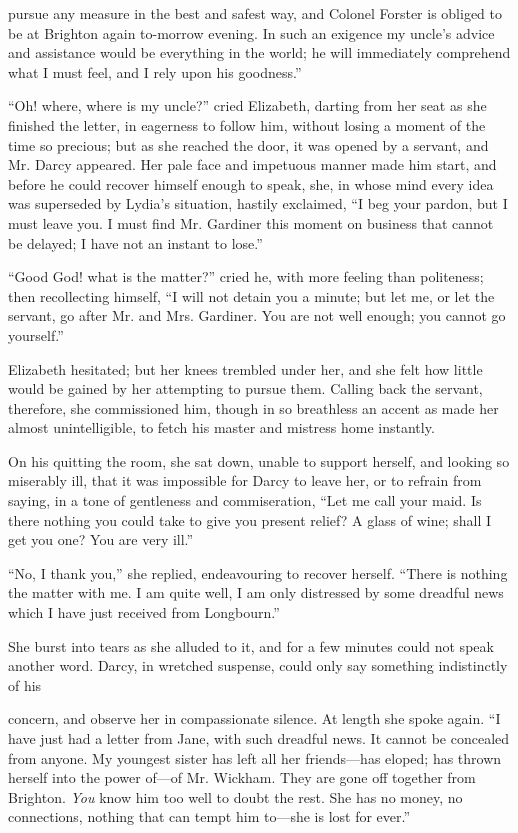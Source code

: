 pursue any measure in the best and safest way, and Colonel Forster is obliged to be at Brighton again to-morrow evening. In such an exigence my uncle's advice and assistance would be everything in the world; he will immediately comprehend what I must feel, and I rely upon his goodness.''

``Oh! where, where is my uncle?'' cried Elizabeth, darting from her seat as she finished the letter, in eagerness to follow him, without losing a moment of the time so precious; but as she reached the door, it was opened by a servant, and Mr. Darcy appeared. Her pale face and impetuous manner made him start, and before he could recover himself enough to speak, she, in whose mind every idea was superseded by Lydia's situation, hastily exclaimed, ``I beg your pardon, but I must leave you. I must find Mr. Gardiner this moment on business that cannot be delayed; I have not an instant to lose.''

``Good God! what is the matter?'' cried he, with more feeling than politeness; then recollecting himself, ``I will not detain you a minute; but let me, or let the servant, go after Mr. and Mrs. Gardiner. You are not well enough; you cannot go yourself.''

Elizabeth hesitated; but her knees trembled under her, and she felt how little would be gained by her attempting to pursue them. Calling back the servant, therefore, she commissioned him, though in so breathless an accent as made her almost unintelligible, to fetch his master and mistress home instantly.

On his quitting the room, she sat down, unable to support herself, and looking so miserably ill, that it was impossible for Darcy to leave her, or to refrain from saying, in a tone of gentleness and commiseration, ``Let me call your maid. Is there nothing you could take to give you present relief? A glass of wine; shall I get you one? You are very ill.''

``No, I thank you,'' she replied, endeavouring to recover herself. ``There is nothing the matter with me. I am quite well, I am only distressed by some dreadful news which I have just received from Longbourn.''

She burst into tears as she alluded to it, and for a few minutes could not speak another word. Darcy, in wretched suspense, could only say something indistinctly of his




concern, and observe her in compassionate silence. At length she spoke again. ``I have just had a letter from Jane, with such dreadful news. It cannot be concealed from anyone. My youngest sister has left all her friends---has eloped; has thrown herself into the power of---of Mr. Wickham. They are gone off together from Brighton. \textit{You} know him too well to doubt the rest. She has no money, no connections, nothing that can tempt him to---she is lost for ever.''

